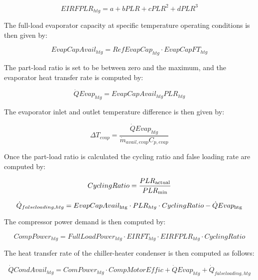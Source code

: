 \begin{equation}
EIRFPL{R_{htg}} = a + bPLR + cPL{R^2} + dPL{R^3}
\end{equation}

The full-load evaporator capacity at specific temperature operating conditions is then given by:

\begin{equation}
EvapCapAvai{l_{htg}} = RefEvapCa{p_{htg}} \cdot EvapCapF{T_{htg}}
\end{equation}

The part-load ratio is set to be between zero and the maximum, and the evaporator heat transfer rate is computed by:

\begin{equation}
\dot QEva{p_{htg}} = EvapCapAvai{l_{htg}}PL{R_{htg}}
\end{equation}

The evaporator inlet and outlet temperature difference is then given by:

\begin{equation}
\Delta {T_{evap}} = \frac{{\dot QEva{p_{htg}}}}{{{{\dot m}_{avail,evap}}{C_{p,evap}}}}
\end{equation}

Once the part-load ratio is calculated the cycling ratio and false loading rate are computed by:

\begin{equation}
CyclingRatio = \frac{{PL{R_{{\rm{actual}}}}}}{{PL{R_{{\rm{min}}}}}}
\end{equation}

\begin{equation}
{\dot Q_{falseloading,htg}} = EvapCapAvai{l_{{\rm{htg}}}} \cdot PL{R_{htg}} \cdot CyclingRatio - \dot QEva{p_{{\rm{htg}}}}
\end{equation}

The compressor power demand is then computed by:

\begin{equation}
CompPowe{r_{htg}} = FullLoadPowe{r_{htg}} \cdot EIRF{T_{htg}} \cdot EIRFPL{R_{htg}} \cdot CyclingRatio
\end{equation}

The heat transfer rate of the chiller-heater condenser is then computed as follows:

\begin{equation}
\dot QCondAvai{l_{htg}} = ComPowe{r_{htg}} \cdot CompMotorEffic + \dot QEva{p_{htg}} + {\dot Q_{falseloading,htg}}
\end{equation}

